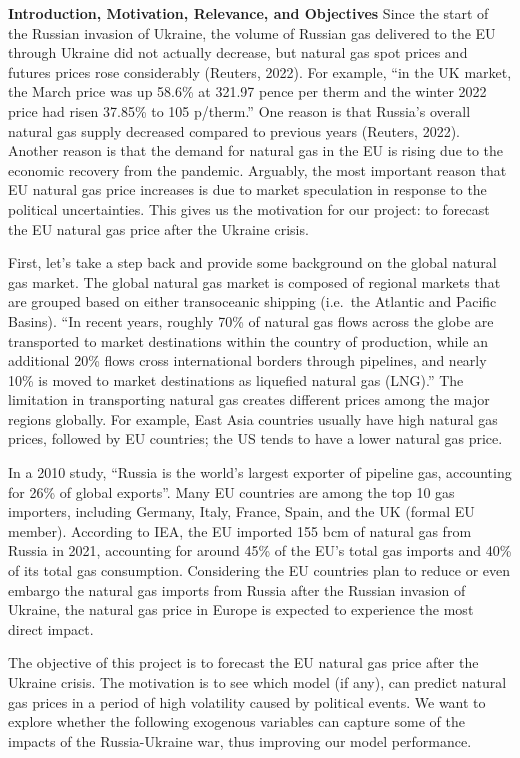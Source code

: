 \documentclass[
]{article}
\begin{document}
\textbf{Introduction, Motivation, Relevance, and Objectives} Since the
start of the Russian invasion of Ukraine, the volume of Russian gas
delivered to the EU through Ukraine did not actually decrease, but
natural gas spot prices and futures prices rose considerably (Reuters,
2022). For example, ``in the UK market, the March price was up 58.6\% at
321.97 pence per therm and the winter 2022 price had risen 37.85\% to
105 p/therm.'' One reason is that Russia's overall natural gas supply
decreased compared to previous years (Reuters, 2022). Another reason is
that the demand for natural gas in the EU is rising due to the economic
recovery from the pandemic. Arguably, the most important reason that EU
natural gas price increases is due to market speculation in response to
the political uncertainties. This gives us the motivation for our
project: to forecast the EU natural gas price after the Ukraine crisis.

First, let's take a step back and provide some background on the global
natural gas market. The global natural gas market is composed of
regional markets that are grouped based on either transoceanic shipping
(i.e.~the Atlantic and Pacific Basins). ``In recent years, roughly 70\%
of natural gas flows across the globe are transported to market
destinations within the country of production, while an additional 20\%
flows cross international borders through pipelines, and nearly 10\% is
moved to market destinations as liquefied natural gas (LNG).'' The
limitation in transporting natural gas creates different prices among
the major regions globally. For example, East Asia countries usually
have high natural gas prices, followed by EU countries; the US tends to
have a lower natural gas price.

In a 2010 study, ``Russia is the world's largest exporter of pipeline
gas, accounting for 26\% of global exports''. Many EU countries are
among the top 10 gas importers, including Germany, Italy, France, Spain,
and the UK (formal EU member). According to IEA, the EU imported 155 bcm
of natural gas from Russia in 2021, accounting for around 45\% of the
EU's total gas imports and 40\% of its total gas consumption.
Considering the EU countries plan to reduce or even embargo the natural
gas imports from Russia after the Russian invasion of Ukraine, the
natural gas price in Europe is expected to experience the most direct
impact.

The objective of this project is to forecast the EU natural gas price
after the Ukraine crisis. The motivation is to see which model (if any),
can predict natural gas prices in a period of high volatility caused by
political events. We want to explore whether the following exogenous
variables can capture some of the impacts of the Russia-Ukraine war,
thus improving our model performance.
\end{document}
